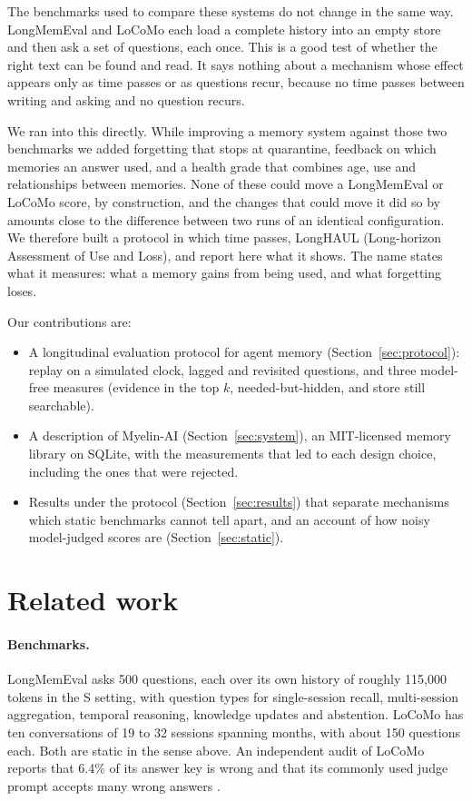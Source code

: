 \documentclass[11pt]{article}
\begin{document}
The benchmarks used to compare these systems do not change in the same
way. LongMemEval \citep{wu2025longmemeval} and LoCoMo
\citep{maharana2024locomo} each load a complete history into an empty
store and then ask a set of questions, each once. This is a good test
of whether the right text can be found and read. It says nothing about
a mechanism whose effect appears only as time passes or as questions
recur, because no time passes between writing and asking and no
question recurs.

We ran into this directly. While improving a memory system against
those two benchmarks we added forgetting that stops at quarantine,
feedback on which memories an answer used, and a health grade that
combines age, use and relationships between memories. None of these
could move a LongMemEval or LoCoMo score, by construction, and the
changes that could move it did so by amounts close to the difference
between two runs of an identical configuration. We therefore built a
protocol in which time passes, LongHAUL (Long-horizon Assessment of Use
and Loss), and report here what it shows. The name states what it
measures: what a memory gains from being used, and what forgetting
loses.

Our contributions are:
\begin{itemize}
\item A longitudinal evaluation protocol for agent memory
  (Section~\ref{sec:protocol}): replay on a simulated clock, lagged and
  revisited questions, and three model-free measures (evidence in the
  top $k$, needed-but-hidden, and store still searchable).
\item A description of \mbox{Myelin-AI} (Section~\ref{sec:system}), an MIT-licensed
  memory library on SQLite, with the measurements that led to each
  design choice, including the ones that were rejected.
\item Results under the protocol (Section~\ref{sec:results}) that
  separate mechanisms which static benchmarks cannot tell apart, and an
  account of how noisy model-judged scores are
  (Section~\ref{sec:static}).
\end{itemize}

\section{Related work}

\paragraph{Benchmarks.} LongMemEval \citep{wu2025longmemeval} asks 500
questions, each over its own history of roughly 115{,}000 tokens in the
S setting, with question types for single-session recall, multi-session
aggregation, temporal reasoning, knowledge updates and abstention.
LoCoMo \citep{maharana2024locomo} has ten conversations of 19 to 32
sessions spanning months, with about 150 questions each. Both are
static in the sense above. An independent audit of LoCoMo reports that
6.4\% of its answer key is wrong and that its commonly used judge
prompt accepts many wrong answers \citep{penfield2026locomo}.
\end{document}
